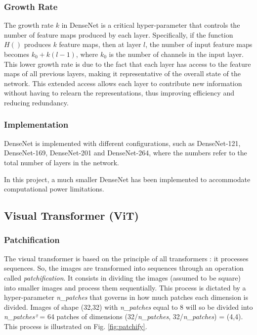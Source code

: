 \documentclass[twocolumn,superscriptaddress,aps]{revtex4-1}
\begin{document}
\subsubsection{Growth Rate}

The growth rate $k$ in DenseNet is a critical hyper-parameter that controls the number of feature maps produced by each layer. Specifically, if the function $H()$ produces $k$ feature maps, then at layer $l$, the number of input feature maps becomes $k_0 + k(l-1)$, where $k_0$ is the number of channels in the input layer. This lower growth rate is due to the fact that each layer has access to the feature maps of all previous layers, making it representative of the overall state of the network. This extended access allows each layer to contribute new information without having to relearn the representations, thus improving efficiency and reducing redundancy.

\subsubsection{Implementation}

DenseNet is implemented with different configurations, such as DenseNet-121, DenseNet-169, DenseNet-201 and DenseNet-264, where the numbers refer to the total number of layers in the network.

In this project, a much smaller DenseNet has been implemented to accommodate computational power limitations.

\subsection{Visual Transformer (ViT)}

\subsubsection{Patchification}

The visual transformer is based on the principle of all transformers : it processes sequences. So, the images are transformed into sequences through an operation called \textit{patchification}. It consists in dividing the images (assumed to be square) into smaller images and process them sequentially. This process is dictated by a hyper-parameter \textit{n\_patches} that governs in how much patches each dimension is divided. Images of shape (32,32) with \textit{n\_patches} equal to 8 will so be divided into \textit{n\_patches²} = 64 patches of dimensions (32/\textit{n\_patches}, 32/\textit{n\_patches}) = (4,4). This process is illustrated on Fig. \ref{fig:patchify}.
\end{document}
